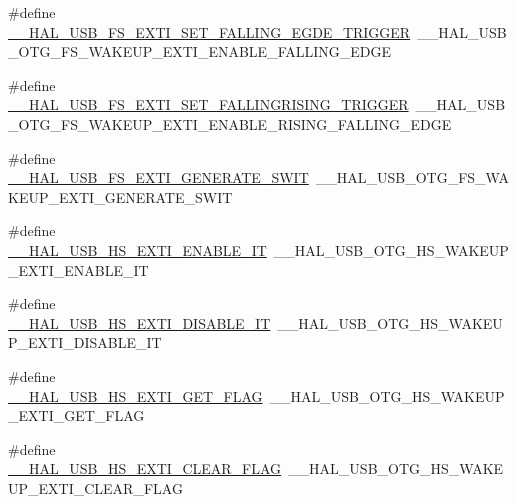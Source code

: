 \begin{DoxyCompactItemize}
\item 
\#define \hyperlink{group___h_a_l___u_s_b___aliased___macros_ga68573497dbc5121fc85cc2c1b5ef14e0}{\+\_\+\+\_\+\+H\+A\+L\+\_\+\+U\+S\+B\+\_\+\+F\+S\+\_\+\+E\+X\+T\+I\+\_\+\+S\+E\+T\+\_\+\+F\+A\+L\+L\+I\+N\+G\+\_\+\+E\+G\+D\+E\+\_\+\+T\+R\+I\+G\+G\+ER}~\+\_\+\+\_\+\+H\+A\+L\+\_\+\+U\+S\+B\+\_\+\+O\+T\+G\+\_\+\+F\+S\+\_\+\+W\+A\+K\+E\+U\+P\+\_\+\+E\+X\+T\+I\+\_\+\+E\+N\+A\+B\+L\+E\+\_\+\+F\+A\+L\+L\+I\+N\+G\+\_\+\+E\+D\+GE
\item 
\#define \hyperlink{group___h_a_l___u_s_b___aliased___macros_ga9ea9069919f81db08800a1b92ee2c6ed}{\+\_\+\+\_\+\+H\+A\+L\+\_\+\+U\+S\+B\+\_\+\+F\+S\+\_\+\+E\+X\+T\+I\+\_\+\+S\+E\+T\+\_\+\+F\+A\+L\+L\+I\+N\+G\+R\+I\+S\+I\+N\+G\+\_\+\+T\+R\+I\+G\+G\+ER}~\+\_\+\+\_\+\+H\+A\+L\+\_\+\+U\+S\+B\+\_\+\+O\+T\+G\+\_\+\+F\+S\+\_\+\+W\+A\+K\+E\+U\+P\+\_\+\+E\+X\+T\+I\+\_\+\+E\+N\+A\+B\+L\+E\+\_\+\+R\+I\+S\+I\+N\+G\+\_\+\+F\+A\+L\+L\+I\+N\+G\+\_\+\+E\+D\+GE
\item 
\#define \hyperlink{group___h_a_l___u_s_b___aliased___macros_gacd4ec43a3a9636070ad5546851ea6623}{\+\_\+\+\_\+\+H\+A\+L\+\_\+\+U\+S\+B\+\_\+\+F\+S\+\_\+\+E\+X\+T\+I\+\_\+\+G\+E\+N\+E\+R\+A\+T\+E\+\_\+\+S\+W\+IT}~\+\_\+\+\_\+\+H\+A\+L\+\_\+\+U\+S\+B\+\_\+\+O\+T\+G\+\_\+\+F\+S\+\_\+\+W\+A\+K\+E\+U\+P\+\_\+\+E\+X\+T\+I\+\_\+\+G\+E\+N\+E\+R\+A\+T\+E\+\_\+\+S\+W\+IT
\item 
\#define \hyperlink{group___h_a_l___u_s_b___aliased___macros_ga57d438cdca8b644cd03124ffcb8ca763}{\+\_\+\+\_\+\+H\+A\+L\+\_\+\+U\+S\+B\+\_\+\+H\+S\+\_\+\+E\+X\+T\+I\+\_\+\+E\+N\+A\+B\+L\+E\+\_\+\+IT}~\+\_\+\+\_\+\+H\+A\+L\+\_\+\+U\+S\+B\+\_\+\+O\+T\+G\+\_\+\+H\+S\+\_\+\+W\+A\+K\+E\+U\+P\+\_\+\+E\+X\+T\+I\+\_\+\+E\+N\+A\+B\+L\+E\+\_\+\+IT
\item 
\#define \hyperlink{group___h_a_l___u_s_b___aliased___macros_ga909208358d7e962ec3328278d80b0dfb}{\+\_\+\+\_\+\+H\+A\+L\+\_\+\+U\+S\+B\+\_\+\+H\+S\+\_\+\+E\+X\+T\+I\+\_\+\+D\+I\+S\+A\+B\+L\+E\+\_\+\+IT}~\+\_\+\+\_\+\+H\+A\+L\+\_\+\+U\+S\+B\+\_\+\+O\+T\+G\+\_\+\+H\+S\+\_\+\+W\+A\+K\+E\+U\+P\+\_\+\+E\+X\+T\+I\+\_\+\+D\+I\+S\+A\+B\+L\+E\+\_\+\+IT
\item 
\#define \hyperlink{group___h_a_l___u_s_b___aliased___macros_ga025ca30b0d6182705d3a59af868ce771}{\+\_\+\+\_\+\+H\+A\+L\+\_\+\+U\+S\+B\+\_\+\+H\+S\+\_\+\+E\+X\+T\+I\+\_\+\+G\+E\+T\+\_\+\+F\+L\+AG}~\+\_\+\+\_\+\+H\+A\+L\+\_\+\+U\+S\+B\+\_\+\+O\+T\+G\+\_\+\+H\+S\+\_\+\+W\+A\+K\+E\+U\+P\+\_\+\+E\+X\+T\+I\+\_\+\+G\+E\+T\+\_\+\+F\+L\+AG
\item 
\#define \hyperlink{group___h_a_l___u_s_b___aliased___macros_gae44d0cdfd6c4408c8fbfa1977e31bf4f}{\+\_\+\+\_\+\+H\+A\+L\+\_\+\+U\+S\+B\+\_\+\+H\+S\+\_\+\+E\+X\+T\+I\+\_\+\+C\+L\+E\+A\+R\+\_\+\+F\+L\+AG}~\+\_\+\+\_\+\+H\+A\+L\+\_\+\+U\+S\+B\+\_\+\+O\+T\+G\+\_\+\+H\+S\+\_\+\+W\+A\+K\+E\+U\+P\+\_\+\+E\+X\+T\+I\+\_\+\+C\+L\+E\+A\+R\+\_\+\+F\+L\+AG

\end{DoxyCompactItemize}
